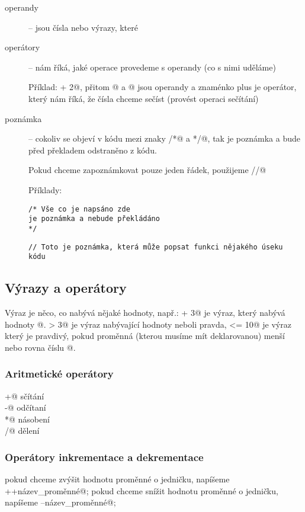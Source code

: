 \begin{description}
\item[operandy] -- jsou čísla nebo výrazy, které  

\item[operátory] -- nám říká, jaké operace provedeme s operandy (co s nimi uděláme) 

Příklad:  + 2@, přitom @ a @ jsou operandy a znaménko plus je operátor, který nám říká, že čísla chceme sečíst (provést operaci sečítání)


\item[poznámka] -- cokoliv se objeví v kódu mezi znaky \verb@/*@  a \verb@*/@, tak je poznámka a bude před překladem odstraněno z kódu. 

Pokud chceme zapoznámkovat pouze jeden řádek, použijeme \verb@//@

Příklady:

%

\begin{verbatim}
/* Vše co je napsáno zde
je poznámka a nebude překládáno
*/
\end{verbatim}

\begin{verbatim}
// Toto je poznámka, která může popsat funkci nějakého úseku kódu
\end{verbatim}

\end{description}


\subsection{Výrazy a operátory}

Výraz je něco, co nabývá nějaké hodnoty, např.:  + 3@ je výraz, 
který nabývá hodnoty @.  > 3@ je výraz nabývající hodnoty \verb@true@ neboli pravda, 
\verb@x <= 10@ je výraz který je pravdivý, pokud proměnná \verb@x@(kterou musíme mít deklarovanou) menší nebo rovna číslu @. 

\subsubsection{Aritmetické operátory}
\verb@+@ sčítání \\
\verb@-@ odčítaní \\
\verb@*@ násobení \\
\verb@/@ dělení \\

\subsubsection{Operátory inkrementace a dekrementace}
pokud chceme zvýšit hodnotu proměnné o jedničku, napíšeme 
\verb@++název_proměnné@;
pokud chceme snížit hodnotu proměnné o jedničku, napíšeme \verb@--název_proměnné@;

